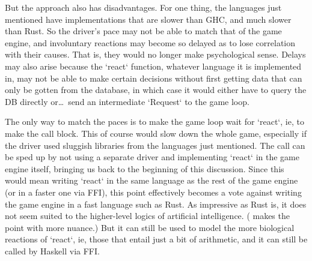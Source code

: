But the approach also has disadvantages.
For one thing, the languages just mentioned have implementations that are
slower than GHC, and much slower than Rust.
So the driver's
pace may not be able to match that of the game engine, and involuntary
reactions may become so delayed as to lose correlation with their causes.
That is, they would no longer make psychological sense.
Delays may also arise because the `react` function, whatever language it is
implemented in,
may not be able to make certain decisions without first getting data that
can only be gotten from the database, in which case it would either have to
query the DB directly or\ldots\ send an intermediate `Request` to the game loop.

The only way to match the paces is to make the game loop wait for `react`,
ie, to make the call block.
This of course would slow down the whole game,
especially if the driver used sluggish libraries from the languages
just mentioned.
The call can be sped up by not using a separate driver
and implementing `react` in the game engine itself, bringing us back to the
beginning of this discussion.
Since this would mean writing `react` in
the same language as the rest of the game engine (or in a faster one via FFI),
this point effectively becomes a vote against writing the game engine
in a fast language such as Rust.
As impressive as Rust is, it does not seem suited to the higher-level logics of
artificial intelligence.
(
makes the point with more nuance.) But it can still be used to model the more
biological reactions of `react`, ie, those that entail just a bit of arithmetic,
and it can still be called by Haskell via FFI\@.